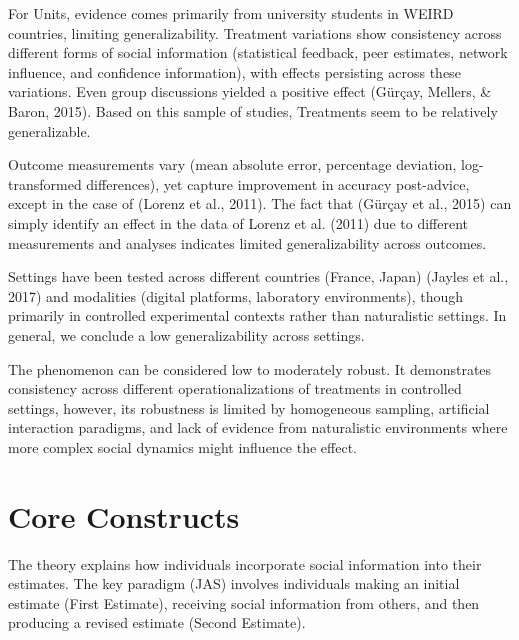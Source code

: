 \documentclass[
  man,floatsintext]{apa6}
\begin{document}
For Units, evidence comes primarily from university students in WEIRD countries, limiting generalizability. Treatment variations show consistency across different forms of social information (statistical feedback, peer estimates, network influence, and confidence information), with effects persisting across these variations. Even group discussions yielded a positive effect (Gürçay, Mellers, \& Baron, 2015). Based on this sample of studies, Treatments seem to be relatively generalizable.

Outcome measurements vary (mean absolute error, percentage deviation, log-transformed differences), yet capture improvement in accuracy post-advice, except in the case of (Lorenz et al., 2011). The fact that (Gürçay et al., 2015) can simply identify an effect in the data of Lorenz et al. (2011) due to different measurements and analyses indicates limited generalizability across outcomes.

Settings have been tested across different countries (France, Japan) (Jayles et al., 2017) and modalities (digital platforms, laboratory environments), though primarily in controlled experimental contexts rather than naturalistic settings. In general, we conclude a low generalizability across settings.

The phenomenon can be considered low to moderately robust. It demonstrates consistency across different operationalizations of treatments in controlled settings, however, its robustness is limited by homogeneous sampling, artificial interaction paradigms, and lack of evidence from naturalistic environments where more complex social dynamics might influence the effect.

\hypertarget{core-constructs}{%
\section{Core Constructs}\label{core-constructs}}

The theory explains how individuals incorporate social information into their estimates. The key paradigm (JAS) involves individuals making an initial estimate (First Estimate), receiving social information from others, and then producing a revised estimate (Second Estimate).
\end{document}

